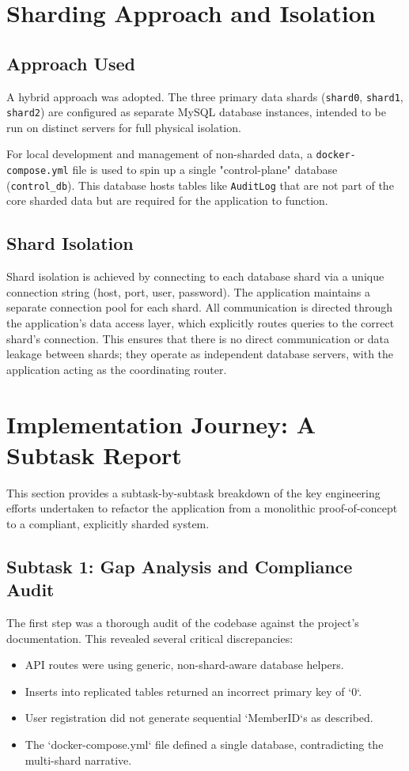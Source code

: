\documentclass{article}
\begin{document}
\section{Sharding Approach and Isolation}
\subsection{Approach Used}
A hybrid approach was adopted. The three primary data shards (\texttt{shard0}, \texttt{shard1}, \texttt{shard2}) are configured as separate MySQL database instances, intended to be run on distinct servers for full physical isolation.

For local development and management of non-sharded data, a \texttt{docker-compose.yml} file is used to spin up a single "control-plane" database (\texttt{control\_db}). This database hosts tables like \texttt{AuditLog} that are not part of the core sharded data but are required for the application to function.

\subsection{Shard Isolation}
Shard isolation is achieved by connecting to each database shard via a unique connection string (host, port, user, password). The application maintains a separate connection pool for each shard. All communication is directed through the application's data access layer, which explicitly routes queries to the correct shard's connection. This ensures that there is no direct communication or data leakage between shards; they operate as independent database servers, with the application acting as the coordinating router.

\section{Implementation Journey: A Subtask Report}
This section provides a subtask-by-subtask breakdown of the key engineering efforts undertaken to refactor the application from a monolithic proof-of-concept to a compliant, explicitly sharded system.

\subsection{Subtask 1: Gap Analysis and Compliance Audit}
The first step was a thorough audit of the codebase against the project's documentation. This revealed several critical discrepancies:
\begin{itemize}
    \item API routes were using generic, non-shard-aware database helpers.
    \item Inserts into replicated tables returned an incorrect primary key of `0`.
    \item User registration did not generate sequential `MemberID`s as described.
    \item The `docker-compose.yml` file defined a single database, contradicting the multi-shard narrative.
\end{itemize}
\end{document}
